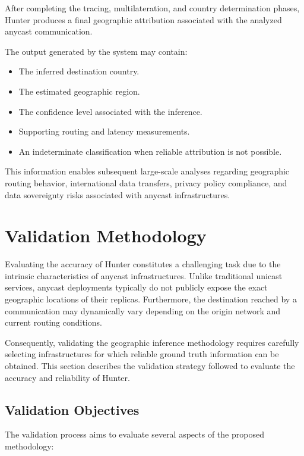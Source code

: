 After completing the tracing, multilateration, and country determination phases, Hunter produces a final geographic attribution associated with the analyzed anycast communication.

The output generated by the system may contain:

\begin{itemize}
    \item The inferred destination country.
    \item The estimated geographic region.
    \item The confidence level associated with the inference.
    \item Supporting routing and latency measurements.
    \item An indeterminate classification when reliable attribution is not possible.
\end{itemize}

This information enables subsequent large-scale analyses regarding geographic routing behavior, international data transfers, privacy policy compliance, and data sovereignty risks associated with anycast infrastructures.

\section{Validation Methodology}
\label{sc:hunter_validation}

Evaluating the accuracy of Hunter constitutes a challenging task due to the intrinsic characteristics of anycast infrastructures. Unlike traditional unicast services, anycast deployments typically do not publicly expose the exact geographic locations of their replicas. Furthermore, the destination reached by a communication may dynamically vary depending on the origin network and current routing conditions.

Consequently, validating the geographic inference methodology requires carefully selecting infrastructures for which reliable ground truth information can be obtained. This section describes the validation strategy followed to evaluate the accuracy and reliability of Hunter.

\subsection{Validation Objectives}

The validation process aims to evaluate several aspects of the proposed methodology:

